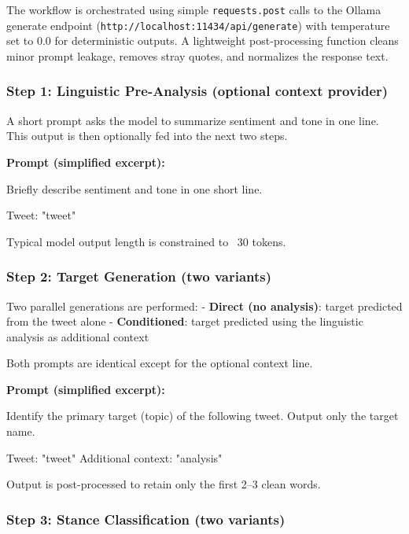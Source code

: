 \documentclass[conference]{IEEEtran}
\begin{document}
The workflow is orchestrated using simple \texttt{requests.post} calls to the Ollama generate endpoint (\texttt{http://localhost:11434/api/generate}) with temperature set to 0.0 for deterministic outputs. A lightweight post-processing function cleans minor prompt leakage, removes stray quotes, and normalizes the response text.

\subsubsection{Step 1: Linguistic Pre-Analysis (optional context provider)}

A short prompt asks the model to summarize sentiment and tone in one line. This output is then optionally fed into the next two steps.

\textbf{Prompt (simplified excerpt):}
\begin{tcolorbox}[colback=gray!10, colframe=gray!50, title=Linguistic Analysis Prompt, fonttitle=\small, arc=2pt]
Briefly describe sentiment and tone in one short line.

Tweet: "{tweet}"
\end{tcolorbox}

Typical model output length is constrained to ~30 tokens.

\subsubsection{Step 2: Target Generation (two variants)}

Two parallel generations are performed:
- \textbf{Direct (no analysis)}: target predicted from the tweet alone
- \textbf{Conditioned}: target predicted using the linguistic analysis as additional context

Both prompts are identical except for the optional context line.

\textbf{Prompt (simplified excerpt):}
\begin{tcolorbox}[colback=gray!10, colframe=gray!50, title=Target Generation Prompt, fonttitle=\small, arc=2pt]
Identify the primary target (topic) of the following tweet. Output only the target name.

Tweet: "{tweet}"
Additional context: "{analysis}"   %
\end{tcolorbox}

Output is post-processed to retain only the first 2–3 clean words.

\subsubsection{Step 3: Stance Classification (two variants)}
\end{document}
